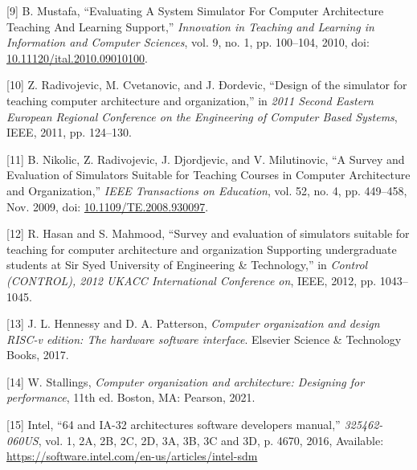 \documentclass[12pt,oneside]{templates/unerthesis}
\newcommand{\CSLLeftMargin}[1]{#1} %
\newcommand{\CSLRightInline}[1]{#1} %
\newlength{\cslhangindent}
\newenvironment{CSLReferences}[2] %
 {\setlength{\parindent}{0pt}%
  \setlength{\leftskip}{#1 pt\relax}%
  \setlength{\parskip}{#2 pt\relax}%
  \everypar{\setlength{\hangindent}{\cslhangindent}}}
 {\par}
\begin{document}
\begin{CSLReferences}{0}{0}
\leavevmode{}%
\CSLLeftMargin{{[}9{]} }%
\CSLRightInline{B. Mustafa, {``Evaluating {A} {System} {Simulator} {For} {Computer} {Architecture} {Teaching} {And} {Learning} {Support},''} \emph{Innovation in Teaching and Learning in Information and Computer Sciences}, vol. 9, no. 1, pp. 100--104, 2010, doi: \href{https://doi.org/10.11120/ital.2010.09010100}{10.11120/ital.2010.09010100}.}

\leavevmode{}%
\CSLLeftMargin{{[}10{]} }%
\CSLRightInline{Z. Radivojevic, M. Cvetanovic, and J. Ðordevic, {``Design of the simulator for teaching computer architecture and organization,''} in \emph{2011 {Second} {Eastern} {European} {Regional} {Conference} on the {Engineering} of {Computer} {Based} {Systems}}, IEEE, 2011, pp. 124--130.}

\leavevmode{}%
\CSLLeftMargin{{[}11{]} }%
\CSLRightInline{B. Nikolic, Z. Radivojevic, J. Djordjevic, and V. Milutinovic, {``A {Survey} and {Evaluation} of {Simulators} {Suitable} for {Teaching} {Courses} in {Computer} {Architecture} and {Organization},''} \emph{IEEE Transactions on Education}, vol. 52, no. 4, pp. 449--458, Nov. 2009, doi: \href{https://doi.org/10.1109/TE.2008.930097}{10.1109/TE.2008.930097}.}

\leavevmode{}%
\CSLLeftMargin{{[}12{]} }%
\CSLRightInline{R. Hasan and S. Mahmood, {``Survey and evaluation of simulators suitable for teaching for computer architecture and organization {Supporting} undergraduate students at {Sir} {Syed} {University} of {Engineering} \& {Technology},''} in \emph{Control ({CONTROL}), 2012 {UKACC} {International} {Conference} on}, IEEE, 2012, pp. 1043--1045.}

\leavevmode{}%
\CSLLeftMargin{{[}13{]} }%
\CSLRightInline{J. L. Hennessy and D. A. Patterson, \emph{Computer organization and design RISC-v edition: The hardware software interface}. Elsevier Science \& Technology Books, 2017.}

\leavevmode{}%
\CSLLeftMargin{{[}14{]} }%
\CSLRightInline{W. Stallings, \emph{Computer organization and architecture: Designing for performance}, 11th ed. Boston, MA: Pearson, 2021.}

\leavevmode{}%
\CSLLeftMargin{{[}15{]} }%
\CSLRightInline{Intel, {``64 and {IA}-32 architectures software developers manual,''} \emph{325462-060US}, vol. 1, 2A, 2B, 2C, 2D, 3A, 3B, 3C and 3D, p. 4670, 2016, Available: \url{https://software.intel.com/en-us/articles/intel-sdm}}


\end{CSLReferences}
\end{document}
